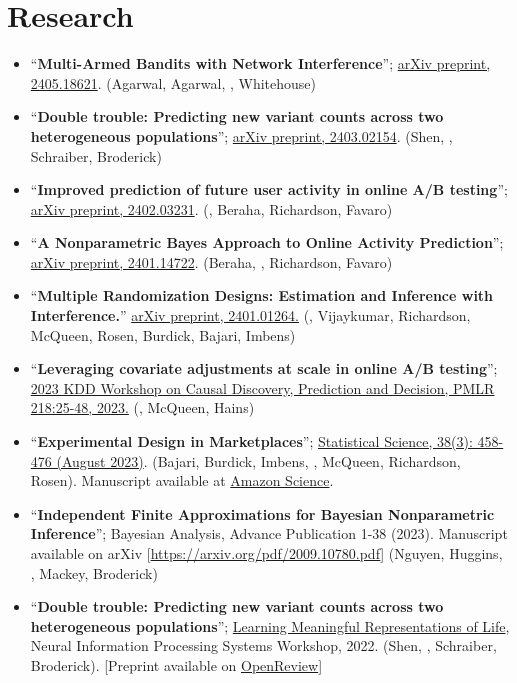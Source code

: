 \documentclass[10pt, a4paper]{article}
\newcommand{\years}[1]{\marginnote{\scriptsize #1}}
\begin{document}
\section*{Research}
\begin{itemize}
	\item ``\textbf{Multi-Armed Bandits with Network Interference}''; \href{https://arxiv.org/abs/2405.18621}{arXiv preprint, 2405.18621}. (Agarwal, Agarwal, \mm, Whitehouse)
	\item ``\textbf{Double trouble: Predicting new variant counts across two heterogeneous populations}''; \href{https://arxiv.org/pdf/2403.02154.pdf}{arXiv preprint, 2403.02154}. (Shen, \mm, Schraiber, Broderick)
	\item ``\textbf{Improved prediction of future user activity in online A/B testing}''; \href{https://arxiv.org/abs/2402.03231}{arXiv preprint, 2402.03231}. (\mm, Beraha, Richardson, Favaro)
	\item ``\textbf{A Nonparametric Bayes Approach to Online Activity Prediction}''; \href{https://arxiv.org/abs/2401.14722}{arXiv preprint, 2401.14722}. (Beraha, \mm, Richardson, Favaro)
	\item ``\textbf{Multiple Randomization Designs: Estimation and Inference with Interference.}'' \href{https://arxiv.org/abs/2401.01264}{arXiv preprint, 2401.01264.} (\mm, Vijaykumar, Richardson, McQueen, Rosen, Burdick, Bajari, Imbens) 
	\item ``\textbf{Leveraging covariate adjustments at scale in online A/B testing}''; \href{https://proceedings.mlr.press/v218/masoero23a.html}{2023 KDD Workshop on Causal Discovery, Prediction and Decision, PMLR 218:25-48, 2023.} (\mm, McQueen, Hains)
	\item ``\textbf{Experimental Design in Marketplaces}''; \href{https://projecteuclid.org/journals/statistical-science/advance-publication/Experimental-Design-in-Marketplaces/10.1214/23-STS883.short}{Statistical Science, 38(3): 458-476 (August 2023)}. (Bajari, Burdick, Imbens, \mm, McQueen, Richardson, Rosen). Manuscript available at \href{https://www.amazon.science/publications/experimental-design-in-marketplaces}{Amazon Science}.
	\item ``\textbf{Independent Finite Approximations for Bayesian Nonparametric Inference}''; Bayesian Analysis, Advance Publication 1-38 (2023). Manuscript available on arXiv [\url{https://arxiv.org/pdf/2009.10780.pdf}] (Nguyen, Huggins, \mm, Mackey, Broderick)
	\item ``\textbf{Double trouble: Predicting new variant counts across two heterogeneous populations}''; \href{https://www.lmrl.org/}{Learning Meaningful Representations of Life},  Neural Information Processing Systems Workshop, 2022. (Shen, \mm, Schraiber, Broderick). [Preprint available on \href{https://openreview.net/pdf?id=euBgC9yLeyl}{OpenReview}]

\end{itemize}
\end{document}
